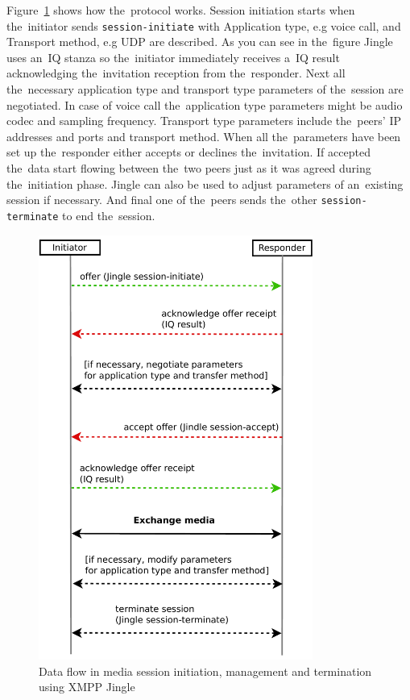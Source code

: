 Figure~\ref{fig:xmppJingleDataFlow} shows how the~protocol works. Session initiation starts when the~initiator sends \verb|session-initiate| with Application type, e.g voice call, and Transport method, e.g UDP are described. As you can see in the~figure Jingle uses an~IQ stanza so the~initiator immediately receives a~IQ result acknowledging the~invitation reception from the~responder. Next all the~necessary application type and transport type parameters of the~session are negotiated. In case of voice call the~application type parameters might be audio codec and sampling frequency. Transport type parameters include the~peers' IP addresses and ports and transport method. When all the~parameters have been set up the~responder either accepts or declines the~invitation. If accepted the~data start flowing between the~two peers just as it was agreed during the~initiation phase. Jingle can also be used to adjust parameters of an~existing session if necessary. And final one of the~peers sends the~other \verb|session-terminate| to end the~session. 

\begin{figure}[ht]
\begin{center}
	\includegraphics[width=9cm]{fig/jingle-session.pdf}
	\caption{Data flow in media session initiation, management and termination using XMPP Jingle~\cite{xmppBook}}
	\label{fig:xmppJingleDataFlow}
\end{center}
\end{figure}


